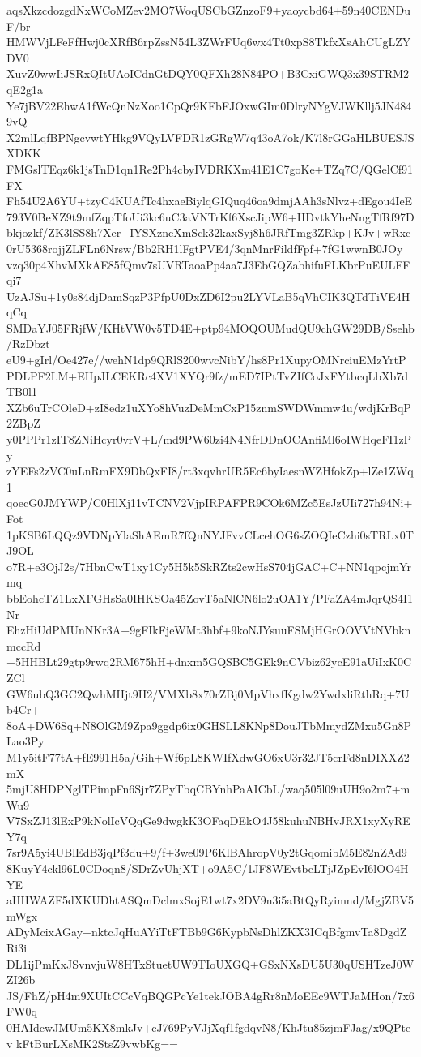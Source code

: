 aqsXkzcdozgdNxWCoMZev2MO7WoqUSCbGZnzoF9+yaoycbd64+59n40CENDuF/br
HMWVjLFeFfHwj0cXRfB6rpZssN54L3ZWrFUq6wx4Tt0xpS8TkfxXsAhCUgLZYDV0
XuvZ0wwIiJSRxQItUAoICdnGtDQY0QFXh28N84PO+B3CxiGWQ3x39STRM2qE2g1a
Ye7jBV22EhwA1fWcQnNzXoo1CpQr9KFbFJOxwGIm0DlryNYgVJWKllj5JN4849vQ
X2mlLqfBPNgcvwtYHkg9VQyLVFDR1zGRgW7q43oA7ok/K7l8rGGaHLBUESJSXDKK
FMGslTEqz6k1jsTnD1qn1Re2Ph4cbyIVDRKXm41E1C7goKe+TZq7C/QGelCf91FX
Fh54U2A6YU+tzyC4KUAfTc4hxaeBiylqGIQuq46oa9dmjAAh3sNlvz+dEgou4IeE
793V0BeXZ9t9mfZqpTfoUi3kc6uC3aVNTrKf6XscJipW6+HDvtkYheNngTfRf97D
bkjozkf/ZK3lSS8h7Xer+IYSXzncXmSck32kaxSyj8h6JRfTmg3ZRkp+KJv+wRxc
0rU5368rojjZLFLn6Nrsw/Bb2RH1lFgtPVE4/3qnMnrFildfFpf+7fG1wwnB0JOy
vzq30p4XhvMXkAE85fQmv7sUVRTaoaPp4aa7J3EbGQZabhifuFLKbrPuEULFFqi7
UzAJSu+1y0s84djDamSqzP3PfpU0DxZD6I2pu2LYVLaB5qVhCIK3QTdTiVE4HqCq
SMDaYJ05FRjfW/KHtVW0v5TD4E+ptp94MOQOUMudQU9chGW29DB/Ssehb/RzDbzt
eU9+gIrl/Oe427e//wehN1dp9QRlS200wvcNibY/hs8Pr1XupyOMNrciuEMzYrtP
PDLPF2LM+EHpJLCEKRc4XV1XYQr9fz/mED7IPtTvZIfCoJxFYtbcqLbXb7dTB0l1
XZb6uTrCOleD+zI8edz1uXYo8hVuzDeMmCxP15znmSWDWmmw4u/wdjKrBqP2ZBpZ
y0PPPr1zIT8ZNiHcyr0vrV+L/md9PW60zi4N4NfrDDnOCAnfiMl6oIWHqeFI1zPy
zYEFs2zVC0uLnRmFX9DbQxFI8/rt3xqvhrUR5Ec6byIaesnWZHfokZp+lZe1ZWq1
qoecG0JMYWP/C0HlXj11vTCNV2VjpIRPAFPR9COk6MZc5EsJzUIi727h94Ni+Fot
1pKSB6LQQz9VDNpYlaShAEmR7fQnNYJFvvCLcehOG6sZOQIeCzhi0sTRLx0TJ9OL
o7R+e3OjJ2s/7HbnCwT1xy1Cy5H5k5SkRZts2cwHsS704jGAC+C+NN1qpcjmYrmq
bbEohcTZ1LxXFGHsSa0IHKSOa45ZovT5aNlCN6lo2uOA1Y/PFaZA4mJqrQS4I1Nr
EhzHiUdPMUnNKr3A+9gFIkFjeWMt3hbf+9koNJYsuuFSMjHGrOOVVtNVbknmccRd
+5HHBLt29gtp9rwq2RM675hH+dnxm5GQSBC5GEk9nCVbiz62ycE91aUiIxK0CZCl
GW6ubQ3GC2QwhMHjt9H2/VMXb8x70rZBj0MpVhxfKgdw2YwdxliRthRq+7Ub4Cr+
8oA+DW6Sq+N8OlGM9Zpa9ggdp6ix0GHSLL8KNp8DouJTbMmydZMxu5Gn8PLao3Py
M1y5itF77tA+fE991H5a/Gih+Wf6pL8KWIfXdwGO6xU3r32JT5crFd8nDIXXZ2mX
5mjU8HDPNglTPimpFn6Sjr7ZPyTbqCBYnhPaAICbL/waq505l09uUH9o2m7+mWu9
V7SxZJ13lExP9kNolIcVQqGe9dwgkK3OFaqDEkO4J58kuhuNBHvJRX1xyXyREY7q
7sr9A5yi4UBlEdB3jqPf3du+9/f+3we09P6KlBAhropV0y2tGqomibM5E82nZAd9
8KuyY4ckl96L0CDoqn8/SDrZvUhjXT+o9A5C/1JF8WEvtbeLTjJZpEvI6lOO4HYE
aHHWAZF5dXKUDhtASQmDclmxSojE1wt7x2DV9n3i5aBtQyRyimnd/MgjZBV5mWgx
ADyMcixAGay+nktcJqHuAYiTtFTBb9G6KypbNsDhlZKX3ICqBfgmvTa8DgdZRi3i
DL1ijPmKxJSvnvjuW8HTxStuetUW9TIoUXGQ+GSxNXsDU5U30qUSHTzeJ0WZI26b
JS/FhZ/pH4m9XUItCCcVqBQGPcYe1tekJOBA4gRr8nMoEEc9WTJaMHon/7x6FW0q
0HAIdcwJMUm5KX8mkJv+cJ769PyVJjXqf1fgdqvN8/KhJtu85zjmFJag/x9QPtev
kFtBurLXsMK2StsZ9vwbKg==
